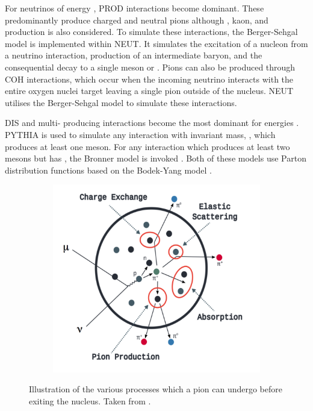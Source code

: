 For neutrinos of energy , PROD interactions become dominant. These predominantly produce charged and neutral pions although \quickmath{\gamma}, kaon, and \quickmath{\eta} production is also considered. To simulate these interactions, the Berger-Sehgal \cite{PhysRevD.76.113004} model is implemented within NEUT. It simulates the excitation of a nucleon from a neutrino interaction, production of an intermediate baryon, and the consequential decay to a single meson or \quickmath{\gamma}. Pions can also be produced through COH interactions, which occur when the incoming neutrino interacts with the entire oxygen nuclei target leaving a single pion outside of the nucleus. NEUT utilises the Berger-Sehgal \cite{Berger_Sehgal_coh} model to simulate these interactions.

DIS and multi-\quickmath{\pi} producing interactions become the most dominant for energies . PYTHIA \cite{Sjstrand1994} is used to simulate any interaction with invariant mass, , which produces at least one meson. For any interaction which produces at least two mesons but has , the Bronner model is invoked \cite{Bronner2016}. Both of these models use Parton distribution functions based on the Bodek-Yang model \cite{Gl_ck_1998,10.48550/arxiv.1011.6592,10.48550/arxiv.1012.0261}. 

\begin{figure}[h]
  \begin{subfigure}[t]{0.8\textwidth}
    \includegraphics[width=\textwidth, trim={0mm 0mm 0mm 0mm}, clip,page=1]{Figures/Selections/FSIDiagram.pdf}
  \end{subfigure}
  \caption{Illustration of the various processes which a pion can undergo before exiting the nucleus. Taken from \cite{10.48550/arxiv.1602.05299}.}
  \label{fig:Selection_FSIDiagram}
\end{figure}

